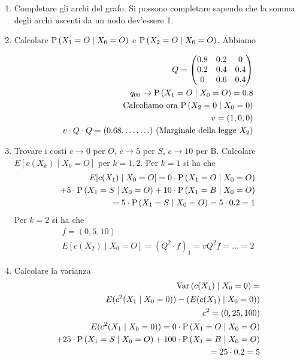 \begin{enumerate}
	\item Completare gli archi del grafo. Si possono completare sapendo che la somma degli archi uscenti da un nodo dev'essere 1.
	\item Calcolare $ \text{P}\left(X_1 = O \mid X_0 = O\right) $ e $ \text{P}\left(X_2 = O \mid X_0 = O\right) $. Abbiamo
	
	\[ \begin{aligned}
	Q = \begin{pmatrix}
	0.8 & 0.2 & 0 \\
	0.2 & 0.4 & 0.4 \\
	0 & 0.6 & 0.4
	\end{pmatrix} \\
	q_{00} \to \text{P}\left(X_1 = O \mid X_0 = O\right) = 0.8 \\
	\text{Calcoliamo ora } \text{P}\left(X_2 = 0 \mid X_0 = 0\right) \\
	v = (1, 0, 0) \\
	v \cdot Q \cdot Q = (0.68, \hdots, \hdots) \text{ (Marginale della legge } X_2)
	\end{aligned}  \]
	\item Trovare i costi $ c \to 0 $ per $ O $, $ c \to 5 $ per $ S $, $ c \to 10 $ per B. Calcolare $ E[c(X_k) \mid X_0 = O] $ per $ k = 1,2 $.
	Per $ k = 1 $ si ha che 
	\[ \begin{aligned}
	E[c(X_1) \mid X_0 = O] = 0 \cdot \text{P}\left(X_1 = O \mid X_0 = O \right) \\
	+ 5 \cdot \text{P}\left(X_1 = S \mid X_0 = O\right) + 10 \cdot \text{P}\left(X_1 = B \mid X_0 = O\right) \\
	= 5 \cdot \text{P}\left(X_1 = S \mid X_0 = O\right) = 5 \cdot 0.2 = 1 
	\end{aligned} \]
	Per $ k = 2 $ si ha che
	\[ \begin{aligned} 
	f = (0, 5, 10) \\
	E[c(X_2) \mid X_0 = O] = (Q^2 \cdot f)_1 = vQ^2f = \hdots = 2
	\end{aligned} \]
	
	\item Calcolare la varianza 
	\[ \begin{aligned}
	\text{Var}\left(c(X_1) \mid X_0 = 0\right) = \\
	E(c^2(X_1 \mid X_0 = 0)) - (E(c(X_1) \mid X_0 = 0)) \\
	c^2=(0, 25, 100) \\
	E(c^2(X_1 \mid X_0 = 0)) = 0 \cdot \text{P}\left(X_1 = O \mid X_0 = O \right) \\
	+ 25 \cdot \text{P}\left(X_1 = S \mid X_0 = O \right) + 100 \cdot \text{P}\left(X_1 = B \mid X_0 = O \right) \\ 
	= 25 \cdot 0.2 = 5
	\end{aligned} \]
	

\end{enumerate}
